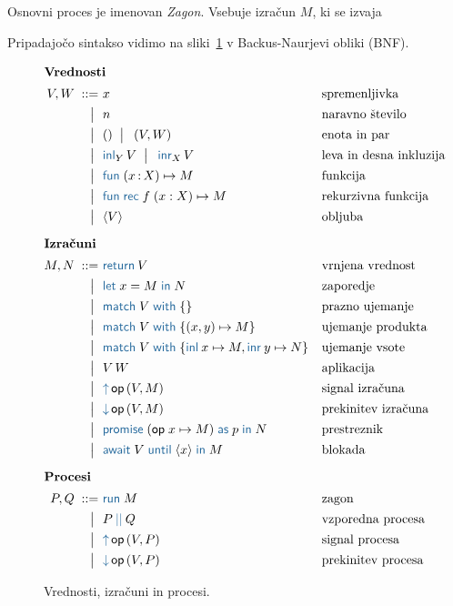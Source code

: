 Osnovni proces je imenovan \emph{Zagon}. Vsebuje izračun $M$, ki se izvaja 


Pripadajočo sintakso vidimo na sliki~\ref{fig:izrazi} v Backus-Naurjevi obliki (BNF).

\begin{figure}[H]

	\centering
	\small
	\begin{align*}
	\intertext{\textbf{Vrednosti}}
	V, W
	\bnfis& x                                       & &\text{spremenljivka} \\
	\bnfor& n    							        & &\text{naravno število} \\
	\bnfor& \tmunit \bnfor\! \tmpair{V}{W}          & &\text{enota in par} \\
	\bnfor& \tminl[Y]{V} \bnfor\! \tminr[X]{V}      & &\text{leva in desna inkluzija} \\
	\bnfor& \tmfun{x \of X}{M}                      & &\text{funkcija} \\
	\bnfor& \tmfunrec{f}{x : X}{M}                  & &\text{rekurzivna funkcija} \\
	\bnfor& \tmpromise V                            & &\text{obljuba}
	\\[1ex]
	\intertext{\textbf{Izračuni}}
	M, N
	\bnfis& \tmreturn{V}                            & &\text{vrnjena vrednost} \\
	\bnfor& \tmlet{x}{M}{N}                         & &\text{zaporedje} \\
	\bnfor& \tmmatch[]{V}{}                         & &\text{prazno ujemanje} \\
	\bnfor& \tmmatch{V}{\tmpair{x}{y} \mapsto M}    & &\text{ujemanje produkta} \\
	\bnfor& \tmmatch{V}{\tminl{x} \mapsto M, \tminr{y} \mapsto N}	& &\text{ujemanje vsote} \\
	\bnfor& V\,W                                    & &\text{aplikacija} \\
	\bnfor& \tmopout{op}{V}{M}       & &\text{signal izračuna} \\
	\bnfor& \tmopin{op}{V}{M}          & &\text{prekinitev izračuna} \\
	\bnfor& \tmwith{op}{x}{M}{p}{N}      & &\text{prestreznik} \\
	\bnfor& \tmawait{V}{x}{M}             & &\text{blokada}
		\\[1ex]
	\intertext{\textbf{Procesi}}
 	P, Q
	\bnfis & \tmrun M & & \text{zagon} \\
	\bnfor & \tmpar P Q & & \text{vzporedna procesa} \\
	\bnfor & \tmopout{op}{V}{P} & & \text{signal procesa} \\
	\bnfor & \tmopin{op}{V}{P} & & \text{prekinitev procesa}
	\end{align*}

	\caption{Vrednosti, izračuni in procesi.}
	\label{fig:izrazi}
\end{figure}


